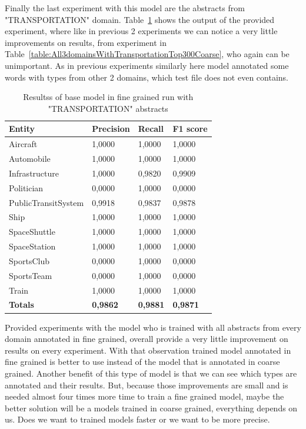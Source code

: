 \documentclass[thesis=M,english]{FITthesis}[2018/05/30]
\begin{document}
    Finally the last experiment with this model are the abstracts from "TRANSPORTATION" domain. Table~\ref{table:All3domainsWithTransportationTop300Fine} shows the output of the provided experiment, where like in previous 2 experiments we can notice a very little improvements on results, from experiment in Table~\ref{table:All3domainsWithTransportationTop300Coarse}, who again can be unimportant. As in previous experiments similarly here model annotated some words with types from other 2 domains, which test file does not even contains.

	\begin{table}[H]\centering
		\begin{tabular}{|l|l|l|l|}
			\hline {\textbf{Entity}} & {\textbf{Precision}} & {\textbf{Recall}} & {\textbf{F1 score}}\\\hline
				Aircraft & 1,0000 & 1,0000 & 1,0000\\
				Automobile & 1,0000 & 1,0000 & 1,0000\\				
				Infrastructure & 1,0000 & 0,9820 & 0,9909\\
				Politician & 0,0000 & 1,0000 & 0,0000\\				
				PublicTransitSystem & 0,9918 & 0,9837 & 0,9878\\
				Ship & 1,0000 & 1,0000 & 1,0000\\				
				SpaceShuttle & 1,0000 & 1,0000 & 1,0000\\
				SpaceStation & 1,0000 & 1,0000 & 1,0000\\
				SportsClub & 0,0000 & 1,0000 & 0,0000\\
				SportsTeam & 0,0000 & 1,0000 & 0,0000\\
				Train & 1,0000 & 1,0000 & 1,0000\\\hline
				\textbf{Totals} & \textbf{0,9862} & \textbf{0,9881} & \textbf{0,9871}\\\hline
		\end{tabular}
		\caption{Resultss of base model in fine grained run with "TRANSPORTATION" abstracts\label{table:All3domainsWithTransportationTop300Fine}}
	\end{table}	
	
	Provided experiments with the model who is trained with all abstracts from every domain annotated in fine grained, overall provide a very little improvement on results on every experiment. With that observation trained model annotated in fine grained is better to use instead of the model that is annotated in coarse grained. Another benefit of this type of model is that we can see which types are annotated and their results. But, because those improvements are small and is needed almost four times more time to train a fine grained model, maybe the better solution will be a models trained in coarse grained, everything depends on us. Does we want to trained models faster or we want to be more precise. 
\end{document}
